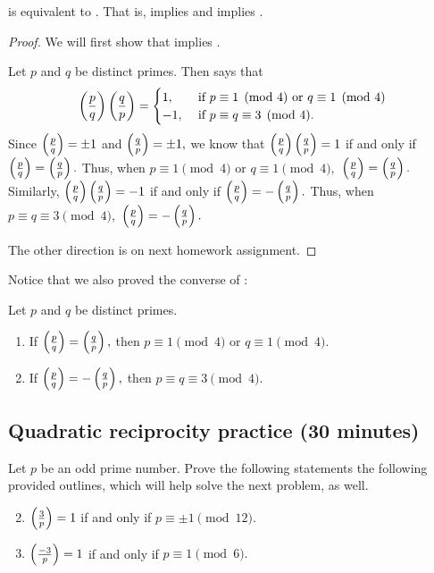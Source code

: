 \documentclass{../ximera}
\begin{document}
\begin{proposition}
  is equivalent to . That is,  implies  and  implies  .
\end{proposition}
\begin{proof}
	We will first show that  implies .
	
	Let $p$ and $q$ be distinct primes.  Then  says that 
	\[
		\left(\frac{p}{q}\right)\left(\frac{q}{p}\right)=
			\begin{cases}
 				1, & \textnormal{ if } p\equiv 1\pmod{4} \textnormal{ or } q\equiv 1\pmod{4}\\
				-1, & \textnormal{ if } p\equiv q\equiv 3\pmod{4}.
			\end{cases}
	\]
	Since $\left(\frac{p}{q}\right)=\pm 1$ and $\left(\frac{q}{p}\right)=\pm 1,$ we know that $\left(\frac{p}{q}\right)\left(\frac{q}{p}\right)=1$ if and only if $\left(\frac{p}{q}\right)=\left(\frac{q}{p}\right).$ Thus, when $p\equiv 1\pmod{4}$ or $q\equiv 1\pmod{4},$ $\left(\frac{p}{q}\right)=\left(\frac{q}{p}\right).$ Similarly, $\left(\frac{p}{q}\right)\left(\frac{q}{p}\right)=-1$ if and only if $\left(\frac{p}{q}\right)=-\left(\frac{q}{p}\right).$ Thus, when $p\equiv q\equiv 3\pmod{4},$ $\left(\frac{p}{q}\right)=-\left(\frac{q}{p}\right).$ 
	
	The other direction is on next homework assignment.
\end{proof}

Notice that we also proved the converse of :
\begin{corollary}\label{cor:quad-rec}
	Let $p$ and $q$ be distinct primes.  
	\begin{enumerate}[label=(\alph*)]
		\item If $\left(\frac{p}{q}\right)=\left(\frac{q}{p}\right),$ then $p\equiv 1 \pmod{4}$ or $q\equiv 1\pmod{4}.$
 		\item If $\left(\frac{p}{q}\right)=-\left(\frac{q}{p}\right),$ then $p\equiv q \equiv 3 \pmod{4}.$
	\end{enumerate}
\end{corollary}


\subsection{Quadratic reciprocity practice (30 minutes)}

\begin{br}
	Let $p$ be an odd prime number. Prove the following statements the following provided outlines, which will help solve the next problem, as well.
	
	\begin{enumerate}[label=(\alph*)]
	\setcounter{enumi}{1}
		\item $\left(\frac{3}{p}\right)=1$ if and only if $p\equiv \pm1\pmod{12}.$
		\item $\left(\frac{-3}{p}\right)=1$ if and only if $p\equiv 1\pmod{6}.$	
	\end{enumerate}
\end{br}
\end{document}
